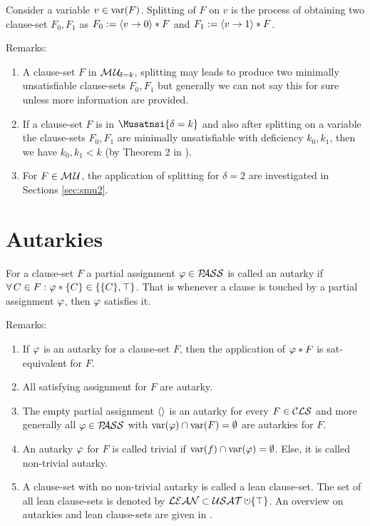 \documentclass{report}
\begin{document}
\begin{defi}\label{def:splitting}
Consider a variable $v \in \operatorname{var}(F)$. Splitting of $F$ on $v$ is the process of obtaining two clause-set $F_0,F_1$ as  $F_0:=\langle v \rightarrow 0 \rangle * F$ and $F_1:=\langle v \rightarrow 1 \rangle * F$.
\end{defi}
Remarks:
  \begin{enumerate}
  \item A clause-set $F$ in $\mathcal{M\hspace{0.8pt}U}_{\!\delta=k}$, splitting may leads to produce two minimally unsatisfiable clause-sets $F_0,F_1$ but generally we can not say this for sure unless more information are provided. 
  \item If a clause-set $F$ is in $\Musatnsi{\delta=k}$ and also after splitting on a variable the clause-sets $F_0,F_1$ are minimally unsatisfiable with deficiency $k_0, k_1$, then we have $k_0, k_1 < k$ (by Theorem 2 in \cite{h24}).
  \item For $F \in \mathcal{M\hspace{0.8pt}U}$, the application of splitting for $\delta=2$ are investigated in Sections \ref{sec:smu2}.
  \end{enumerate}
\section{Autarkies}
\label{sec:autrk}

\begin{defi}\label{def:autarky}
For a clause-set $F$ a partial assignment $\varphi \in \mathcal{P\hspace{-0.32em}ASS}$ is called an autarky if $\forall\, C \in F : \varphi * \{ C \} \in \{ \{ C \}, \top \}$. That is whenever a clause is touched by a partial assignment $\varphi$, then $\varphi$ satisfies it.
\end{defi}
Remarks:
  \begin{enumerate}
  \item If $\varphi$ is an autarky for a clause-set $F$, then the application of $\varphi *F$ is sat-equivalent for $F$. 
  \item All satisfying assignment for $F$ are autarky.
  \item The empty partial assignment $\langle  \rangle$ is an autarky for every $F \in \mathcal{CLS}$ and more generally all $\varphi \in \mathcal{P\hspace{-0.32em}ASS}$ with $\operatorname{var}(\varphi) \cap \operatorname{var}(F) = \emptyset$ are autarkies for $F$. 
  \item An autarky $\varphi$ for $F$ is called trivial if $\operatorname{var}(f) \cap \operatorname{var}(\varphi) = \emptyset$. Else, it is called non-trivial autarky.
  \item A clause-set with no non-trivial autarky is called a lean clause-set. The set of all lean clause-sets is denoted by $\Lean \subset \Usat \addcup \set{\top}$. An overview on autarkies and lean clause-sets are given in \cite{h28, h25}. 
  \end{enumerate}
  
\end{document}
